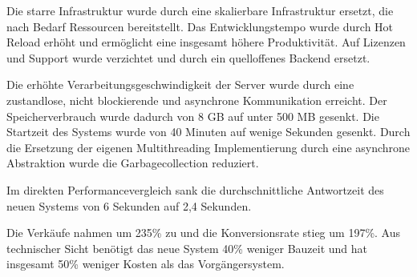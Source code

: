 Die starre Infrastruktur wurde durch eine skalierbare Infrastruktur ersetzt, die nach Bedarf Ressourcen bereitstellt. Das Entwicklungstempo wurde durch Hot Reload erhöht und ermöglicht eine insgesamt höhere Produktivität. Auf Lizenzen und Support wurde verzichtet und durch ein quelloffenes Backend ersetzt.

Die erhöhte Verarbeitungsgeschwindigkeit der Server wurde durch eine zustandlose, nicht blockierende und asynchrone Kommunikation erreicht. Der Speicherverbrauch wurde dadurch von 8 GB auf unter 500 MB gesenkt. Die Startzeit des Systems wurde von 40 Minuten auf wenige Sekunden gesenkt. Durch die Ersetzung der eigenen Multithreading Implementierung durch eine asynchrone Abstraktion wurde die Garbagecollection reduziert. 

Im direkten Performancevergleich sank die durchschnittliche Antwortzeit des neuen Systems von 6 Sekunden auf 2,4 Sekunden.

Die Verkäufe nahmen um 235\% zu und die \gls{Konversionsrate} stieg um 197\%. Aus technischer Sicht benötigt das neue System 40\% weniger Bauzeit und hat insgesamt 50\% weniger Kosten als das Vorgängersystem. 


